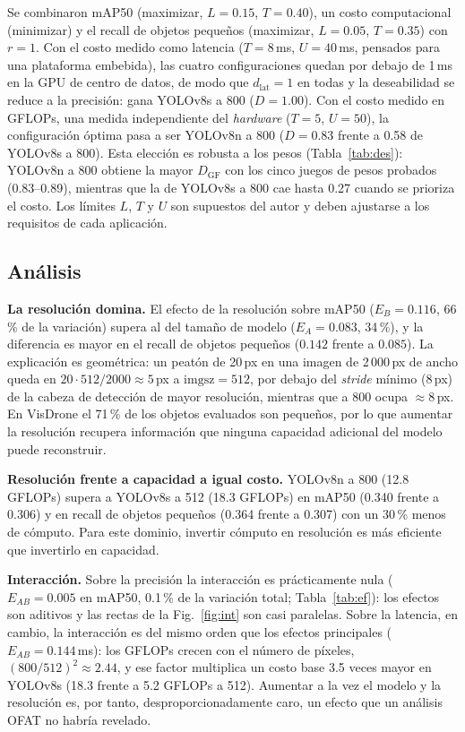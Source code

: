 \documentclass[conference]{IEEEtran}
\begin{document}
Se combinaron mAP50 (maximizar, $L=0.15$, $T=0.40$), un costo computacional (minimizar) y el recall de objetos pequeños (maximizar, $L=0.05$, $T=0.35$) con $r=1$. Con el costo medido como latencia ($T=8$\,ms, $U=40$\,ms, pensados para una plataforma embebida), las cuatro configuraciones quedan por debajo de 1\,ms en la GPU de centro de datos, de modo que $d_{\mathrm{lat}}=1$ en todas y la deseabilidad se reduce a la precisión: gana YOLOv8s a 800 ($D=1.00$). Con el costo medido en GFLOPs, una medida independiente del \emph{hardware} ($T=5$, $U=50$), la configuración óptima pasa a ser YOLOv8n a 800 ($D=0.83$ frente a 0.58 de YOLOv8s a 800). Esta elección es robusta a los pesos (Tabla~\ref{tab:des}): YOLOv8n a 800 obtiene la mayor $D_{\mathrm{GF}}$ con los cinco juegos de pesos probados (0.83--0.89), mientras que la de YOLOv8s a 800 cae hasta 0.27 cuando se prioriza el costo. Los límites $L$, $T$ y $U$ son supuestos del autor y deben ajustarse a los requisitos de cada aplicación.

\subsection{Análisis}
\textbf{La resolución domina.} El efecto de la resolución sobre mAP50 ($E_B=0.116$, 66\,\% de la variación) supera al del tamaño de modelo ($E_A=0.083$, 34\,\%), y la diferencia es mayor en el recall de objetos pequeños ($0.142$ frente a $0.085$). La explicación es geométrica: un peatón de 20\,px en una imagen de 2\,000\,px de ancho queda en $20\cdot512/2000\approx5$\,px a $\text{imgsz}=512$, por debajo del \emph{stride} mínimo (8\,px) de la cabeza de detección de mayor resolución, mientras que a 800 ocupa $\approx8$\,px. En VisDrone el 71\,\% de los objetos evaluados son pequeños, por lo que aumentar la resolución recupera información que ninguna capacidad adicional del modelo puede reconstruir.

\textbf{Resolución frente a capacidad a igual costo.} YOLOv8n a 800 (12.8 GFLOPs) supera a YOLOv8s a 512 (18.3 GFLOPs) en mAP50 (0.340 frente a 0.306) y en recall de objetos pequeños (0.364 frente a 0.307) con un 30\,\% menos de cómputo. Para este dominio, invertir cómputo en resolución es más eficiente que invertirlo en capacidad.

\textbf{Interacción.} Sobre la precisión la interacción es prácticamente nula ($E_{AB}=0.005$ en mAP50, 0.1\,\% de la variación total; Tabla~\ref{tab:ef}): los efectos son aditivos y las rectas de la Fig.~\ref{fig:int} son casi paralelas. Sobre la latencia, en cambio, la interacción es del mismo orden que los efectos principales ($E_{AB}=0.144$\,ms): los GFLOPs crecen con el número de píxeles, $(800/512)^2\approx2.44$, y ese factor multiplica un costo base 3.5 veces mayor en YOLOv8s (18.3 frente a 5.2 GFLOPs a 512). Aumentar a la vez el modelo y la resolución es, por tanto, desproporcionadamente caro, un efecto que un análisis OFAT no habría revelado.
\end{document}
